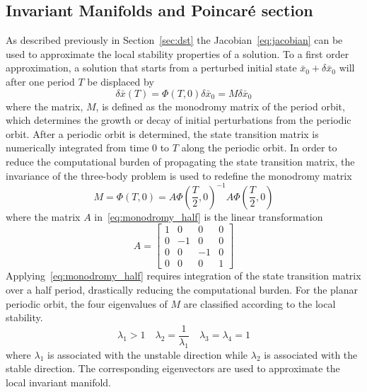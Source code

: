 \subsection{Invariant Manifolds and Poincar\'e section}
As described previously in Section~\ref{sec:dst} the Jacobian~\eqref{eq:jacobian} can be used to approximate the local stability properties of a solution.
To a first order approximation, a solution that starts from a perturbed initial state \( \bar{x}_0 + \delta \bar{x}_0 \) will after one period \(T\) be displaced by
\begin{equation}
	\delta \bar{x}(T) = \Phi(T,0) \delta \bar{x}_0 = M \delta \bar{x}_0
	\label{eq:monodromy}
\end{equation}
where the matrix, \(M\), is defined as the monodromy matrix of the period orbit, which determines the growth or decay of initial perturbations from the periodic orbit.
After a periodic orbit is determined, the state transition matrix is numerically integrated from time \(0\) to \(T\) along the periodic orbit.
In order to reduce the computational burden of propagating the state transition matrix, the invariance of the three-body problem is used to redefine the monodromy matrix
\begin{equation}
	M = \Phi(T,0) = A \Phi\left(\frac{T}{2},0\right)^{-1} A \Phi\left(\frac{T}{2},0\right)
	\label{eq:monodromy_half}
\end{equation}
where the matrix \(A\) in~\eqref{eq:monodromy_half} is the linear transformation
\begin{equation*}
	A = \begin{bmatrix}
		1 & 0 & 0 & 0\\
		0 & -1 & 0 & 0 \\
		0 & 0 & -1 & 0 \\
		0 & 0 & 0 & 1
	\end{bmatrix}
\end{equation*}
Applying~\eqref{eq:monodromy_half} requires integration of the state transition matrix over a half period, drastically reducing the computational burden.
For the planar periodic orbit, the four eigenvalues of \(M\) are classified according to the local stability.
\begin{equation*}
	\lambda_1 > 1 \quad \lambda_2 = \frac{1}{\lambda_1} \quad \lambda_3 = \lambda_4 = 1
\end{equation*}
where \(\lambda_1\) is associated with the unstable direction while \(\lambda_2\) is associated with the stable direction.
The corresponding eigenvectors are used to approximate the local invariant manifold.
